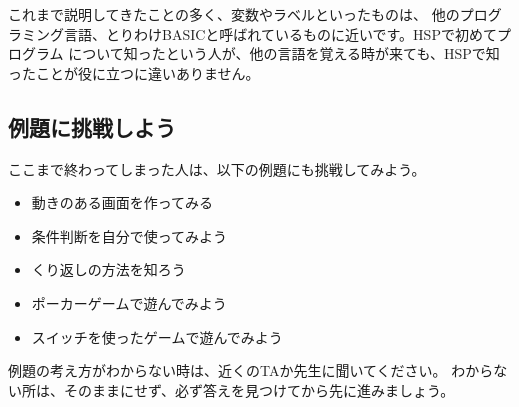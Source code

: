これまで説明してきたことの多く、変数やラベルといったものは、
他のプログラミング言語、とりわけBASICと呼ばれているものに近いです。HSPで初めてプログラム
について知ったという人が、他の言語を覚える時が来ても、HSPで知ったことが役に立つに違いありません。

\subsection{例題に挑戦しよう}

ここまで終わってしまった人は、以下の例題にも挑戦してみよう。

\begin{itemize}
    \item 動きのある画面を作ってみる
    \item 条件判断を自分で使ってみよう
    \item くり返しの方法を知ろう
    \item ポーカーゲームで遊んでみよう
    \item スイッチを使ったゲームで遊んでみよう
\end{itemize}

例題の考え方がわからない時は、近くのTAか先生に聞いてください。
わからない所は、そのままにせず、必ず答えを見つけてから先に進みましょう。

